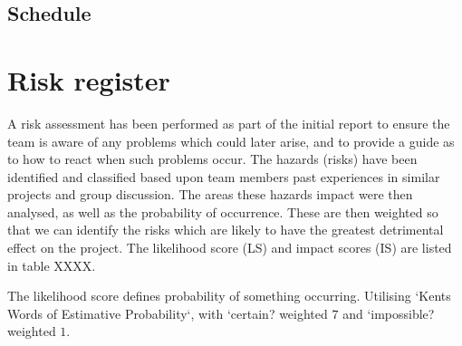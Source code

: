 \documentclass[10pt,a4paper]{article}
\begin{document}
\subsection{Schedule}


\section{Risk register}
A risk assessment has been performed as part of the initial report to ensure the team is aware of any problems which could later arise, and to provide a guide as to how to react when such problems occur. The hazards (risks) have been identified and classified based upon team members past experiences in similar projects and group discussion. The areas these hazards impact were then analysed, as well as the probability of occurrence. These are then weighted so that we can identify the risks which are likely to have the greatest detrimental effect on the project. The likelihood score (LS) and impact scores (IS) are listed in table XXXX. %

The likelihood score defines probability of something occurring. Utilising `Kents Words of Estimative Probability\cite{kent1966strategic}`, with `certain? weighted $7$ and `impossible? weighted $1$.


\end{document}
